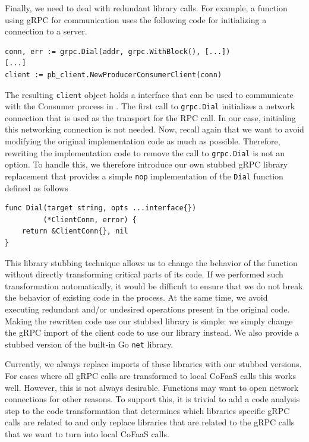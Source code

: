 Finally, we need to deal 
with redundant library calls. For example, a function using gRPC for communication uses the following code for initializing a connection to a server.
\begin{verbatim}
conn, err := grpc.Dial(addr, grpc.WithBlock(), [...])
[...]
client := pb_client.NewProducerConsumerClient(conn)
\end{verbatim}
The resulting \texttt{client} object holds a interface that can be used to communicate with the Consumer process in . The first call to \texttt{grpc.Dial} initializes a network connection that is used as the transport for the RPC call. In our case, initialing this networking connection is not needed. Now, recall again that we want to avoid modifying the original implementation code as much as possible. Therefore, rewriting the implementation code to remove the call to \texttt{grpc.Dial} is not an option. To handle this, we therefore introduce our own stubbed gRPC library replacement that provides a simple \texttt{nop} implementation of the \texttt{Dial} function defined as follows
\begin{verbatim}
func Dial(target string, opts ...interface{})
         (*ClientConn, error) {
    return &ClientConn{}, nil
}
\end{verbatim}

This library stubbing technique allows us to change the behavior of the function without directly transforming critical parts of its code. If we performed such transformation automatically, it would be difficult to ensure that we do not break the behavior of existing code in the process. At the same time, we avoid executing redundant and/or undesired operations present in the original code. Making the rewritten code use our stubbed library is simple: we simply change the gRPC import of the client code to use our library instead. We also provide a stubbed version of the built-in Go \texttt{net} library.

Currently, we always replace imports of these libraries with our stubbed versions. For cases where all gRPC calls are transformed to local CoFaaS calls this works well. However, this is not always desirable. Functions may want to open network connections for other reasons. To support this, it is trivial to add a code analysis step to the code transformation that determines which libraries specific gRPC calls are related to and only replace libraries that are related to the gRPC calls that we want to turn into local CoFaaS calls.

